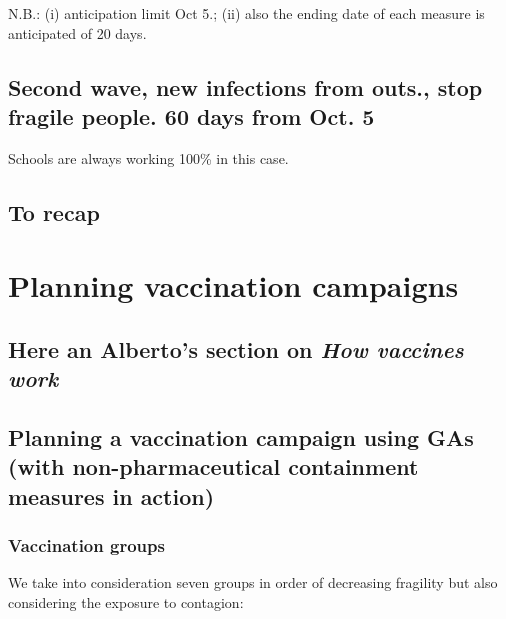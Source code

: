 \documentclass[graybox]{svmult}
\begin{document}
N.B.: (i) anticipation limit Oct 5.; (ii) also the ending date of each measure is anticipated of 20 days.

\subsection{Second wave, new infections from outs., stop fragile people. 60  days from Oct. 5}

Schools are always working 100\% in this case.

\subsection{To recap}

\section{Planning vaccination campaigns}

\subsection{Here an Alberto's section on \emph{How vaccines work}}

\subsection{Planning a vaccination campaign using GAs (with non-pharmaceutical containment measures in action)}

\subsubsection{Vaccination groups}

We take into consideration seven groups in order of decreasing fragility but also considering the exposure to contagion:
\end{document}
